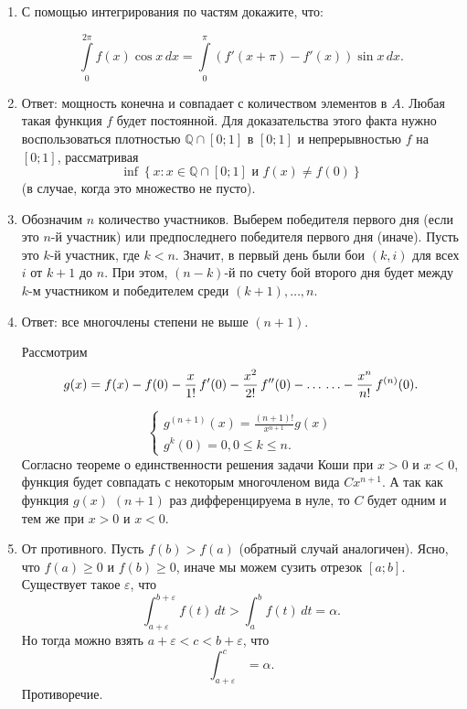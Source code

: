 \begin{enumerate}
\item С помощью интегрирования по частям докажите, что:

$$ \int\limits_0^{2\pi} f(x)\cos x\,dx = 
 \int\limits_0^{\pi} (f'(x+\pi) - f'(x)) \sin{x}\,dx. $$

\item Ответ: мощность конечна и совпадает с количеством элементов в $A$. Любая такая функция $f$ будет постоянной. Для доказательства этого факта нужно воспользоваться плотностью $\mathbb{Q} \cap [0; 1]$ в $[0; 1]$ и непрерывностью $f$ на $[0; 1]$, рассматривая $$\inf \left\lbrace x: x \in \mathbb{Q} \cap [0; 1] \text{ и } f(x) \neq f(0) \right \rbrace$$
(в случае, когда это множество не пусто).

\item Обозначим $n$ количество участников. Выберем победителя первого дня (если это $n$-й участник) или предпоследнего победителя первого дня (иначе). Пусть это $k$-й участник, где $k < n$. Значит, в первый день были бои $(k, i)$ для всех $i$ от $k+1$ до $n$. При этом, $(n-k)$-й по счету бой второго дня будет между $k$-м участником и победителем среди $(k+1), \hdots, n$. 

\item Ответ: все многочлены степени не выше $(n+1)$.

Рассмотрим 
$$g(x) = f(x) - f(0) - \frac{x}{1!}\,f'(0) - \frac{x^2}{2!}\,f''(0) - \hdots\\
\hdots - \frac{x^n}{n!}\,f^{(n)}(0).$$

$$ \begin{cases}
g^{(n+1)}(x) = \frac{(n+1)!}{x^{n+1}} g(x)\\
g^k(0) = 0, 0 \leqslant k \leqslant n.
\end{cases}$$
Согласно теореме о единственности решения задачи Коши при $x > 0$ и $x < 0$, функция будет совпадать с некоторым многочленом вида $C x^{n+1}$. А так как функция $g(x)$ $(n+1)$ раз дифференцируема в нуле, то $C$ будет одним и тем же при $x>0$ и $x<0$.

\item От противного. Пусть $f(b) > f(a)$ (обратный случай аналогичен). Ясно, что $f(a) \geqslant 0$ и $f(b) \geqslant 0$, иначе мы можем сузить отрезок $[a; b]$. Существует такое $\varepsilon$, что 
$$\int_{a+\varepsilon}^{b+\varepsilon} f(t) \,dt > \int_{a}^{b} f(t) \,dt = \alpha.$$ Но тогда можно взять $a + \varepsilon < c < b + \varepsilon$, что
$$\int_{a + \varepsilon}^{c} = \alpha.$$
Противоречие.


\end{enumerate}
